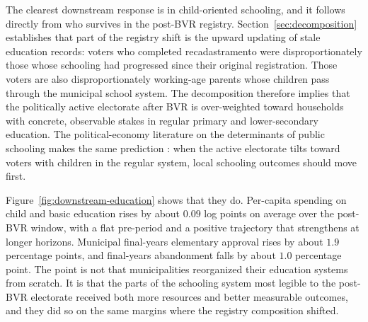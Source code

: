 The clearest downstream response is in child-oriented schooling, and it follows directly from who survives in the post-BVR registry. Section~\ref{sec:decomposition} establishes that part of the registry shift is the upward updating of stale education records: voters who completed recadastramento were disproportionately those whose schooling had progressed since their original registration. Those voters are also disproportionately working-age parents whose children pass through the municipal school system. The decomposition therefore implies that the politically active electorate after BVR is over-weighted toward households with concrete, observable stakes in regular primary and lower-secondary education. The political-economy literature on the determinants of public schooling makes the same prediction \citep{Meltzer1981RationalTheoryThe,Hunter2010}: when the active electorate tilts toward voters with children in the regular system, local schooling outcomes should move first.

Figure~\hyperref[fig:downstream-education]{\ref*{fig:downstream-education}} shows that they do. Per-capita spending on child and basic education rises by about $0.09$ log points on average over the post-BVR window, with a flat pre-period and a positive trajectory that strengthens at longer horizons. Municipal final-years elementary approval rises by about $1.9$ percentage points, and final-years abandonment falls by about $1.0$ percentage point. The point is not that municipalities reorganized their education systems from scratch. It is that the parts of the schooling system most legible to the post-BVR electorate received both more resources and better measurable outcomes, and they did so on the same margins where the registry composition shifted.

\newcommand{\BJSFigRoot}{../resources/figures/downstream_bjs_ref0_nonhybrid}

